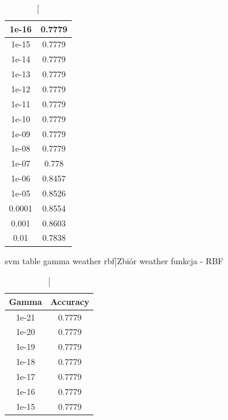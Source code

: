 \documentclass{classrep}
\begin{document}
{{\begin{table}[!htbp]
\begin{minipage}{.3\textwidth}
\begin{tabular}{|c|c|}
                        1e-16 & 0.7779 \\ \hline
                        1e-15 & 0.7779 \\ \hline
                        1e-14 & 0.7779 \\ \hline
                        1e-13 & 0.7779 \\ \hline
                        1e-12 & 0.7779 \\ \hline
                        1e-11 & 0.7779 \\ \hline
                        1e-10 & 0.7779 \\ \hline
                        1e-09 & 0.7779 \\ \hline
                        1e-08 & 0.7779 \\ \hline
                        1e-07 & 0.778 \\ \hline
                        1e-06 & 0.8457 \\ \hline
                        1e-05 & 0.8526 \\ \hline
                        0.0001 & 0.8554 \\ \hline
                        0.001 & 0.8603 \\ \hline
                        0.01 & 0.7838 \\ \hline
                    \end{tabular}
                    \caption
                    [svm table gamma weather rbf]{Zbiór weather funkcja - RBF}
                    \label{svn_table_gamma_weather_rbf}
                \end{minipage}
                \hfill
                \begin{minipage}{.3\textwidth}
                    \centering
                    \begin{tabular}{|c|c|}
                        \hline
                        Gamma & Accuracy \\ \hline
                        1e-21 & 0.7779 \\ \hline
                        1e-20 & 0.7779 \\ \hline
                        1e-19 & 0.7779 \\ \hline
                        1e-18 & 0.7779 \\ \hline
                        1e-17 & 0.7779 \\ \hline
                        1e-16 & 0.7779 \\ \hline
                        1e-15 & 0.7779 \\ \hline

\end{tabular}
\end{minipage}
\end{table}}}
\end{document}
